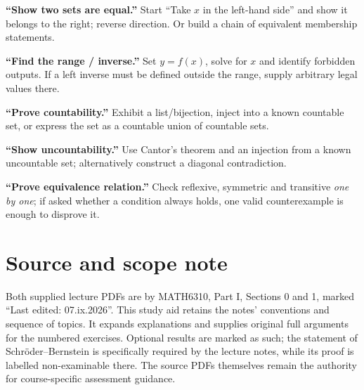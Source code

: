 \documentclass[11pt,a4paper]{article}
\begin{document}
\textbf{``Show two sets are equal.''} Start ``Take $x$ in the left-hand side'' and show it belongs to the right; reverse direction. Or build a chain of equivalent membership statements.

\textbf{``Find the range / inverse.''} Set $y=f(x)$, solve for $x$ and identify forbidden outputs. If a left inverse must be defined outside the range, supply arbitrary legal values there.

\textbf{``Prove countability.''} Exhibit a list/bijection, inject into a known countable set, or express the set as a countable union of countable sets.

\textbf{``Show uncountability.''} Use Cantor's theorem and an injection from a known uncountable set; alternatively construct a diagonal contradiction.

\textbf{``Prove equivalence relation.''} Check reflexive, symmetric and transitive \emph{one by one}; if asked whether a condition always holds, one valid counterexample is enough to disprove it.
\section*{Source and scope note}
Both supplied lecture PDFs are by MATH6310, Part I, Sections 0 and 1, marked ``Last edited: 07.ix.2026''. This study aid retains the notes' conventions and sequence of topics. It expands explanations and supplies original full arguments for the numbered exercises. Optional results are marked as such; the statement of Schr\"oder--Bernstein is specifically required by the lecture notes, while its proof is labelled non-examinable there. The source PDFs themselves remain the authority for course-specific assessment guidance.
\end{document}
